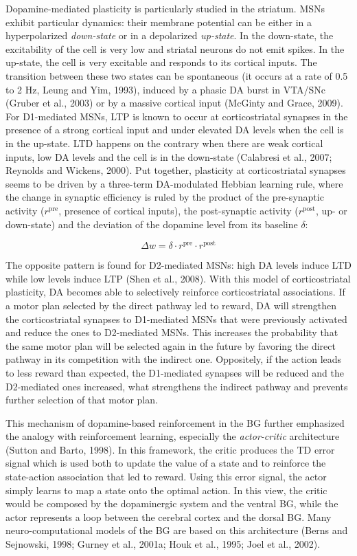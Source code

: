 \documentclass[
  11pt,
  a4paper,
]{scrbook}
\begin{document}
Dopamine-mediated plasticity is particularly studied in the striatum.
MSNs exhibit particular dynamics: their membrane potential can be either
in a hyperpolarized \emph{down-state} or in a depolarized
\emph{up-state}. In the down-state, the excitability of the cell is very
low and striatal neurons do not emit spikes. In the up-state, the cell
is very excitable and responds to its cortical inputs. The transition
between these two states can be spontaneous (it occurs at a rate of 0.5
to 2 Hz, Leung and Yim, 1993), induced by a phasic DA burst in VTA/SNc
(Gruber et al., 2003) or by a massive cortical input (McGinty and Grace,
2009). For D1-mediated MSNs, LTP is known to occur at corticostriatal
synapses in the presence of a strong cortical input and under elevated
DA levels when the cell is in the up-state. LTD happens on the contrary
when there are weak cortical inputs, low DA levels and the cell is in
the down-state (Calabresi et al., 2007; Reynolds and Wickens, 2000). Put
together, plasticity at corticostriatal synapses seems to be driven by a
three-term DA-modulated Hebbian learning rule, where the change in
synaptic efficiency is ruled by the product of the pre-synaptic activity
(\(r^{\text{pre}}\), presence of cortical inputs), the post-synaptic
activity (\(r^{\text{post}}\), up- or down-state) and the deviation of
the dopamine level from its baseline \(\delta\):

\[
    \Delta w = \delta \cdot r^{\text{pre}} \cdot r^{\text{post}}
\]

The opposite pattern is found for D2-mediated MSNs: high DA levels
induce LTD while low levels induce LTP (Shen et al., 2008). With this
model of corticostriatal plasticity, DA becomes able to selectively
reinforce corticostriatal associations. If a motor plan selected by the
direct pathway led to reward, DA will strengthen the corticostriatal
synapses to D1-mediated MSNs that were previously activated and reduce
the ones to D2-mediated MSNs. This increases the probability that the
same motor plan will be selected again in the future by favoring the
direct pathway in its competition with the indirect one. Oppositely, if
the action leads to less reward than expected, the D1-mediated synapses
will be reduced and the D2-mediated ones increased, what strengthens the
indirect pathway and prevents further selection of that motor plan.

This mechanism of dopamine-based reinforcement in the BG further
emphasized the analogy with reinforcement learning, especially the
\emph{actor-critic} architecture (Sutton and Barto, 1998). In this
framework, the critic produces the TD error signal which is used both to
update the value of a state and to reinforce the state-action
association that led to reward. Using this error signal, the actor
simply learns to map a state onto the optimal action. In this view, the
critic would be composed by the dopaminergic system and the ventral BG,
while the actor represents a loop between the cerebral cortex and the
dorsal BG. Many neuro-computational models of the BG are based on this
architecture (Berns and Sejnowski, 1998; Gurney et al., 2001a; Houk et
al., 1995; Joel et al., 2002).
\end{document}
